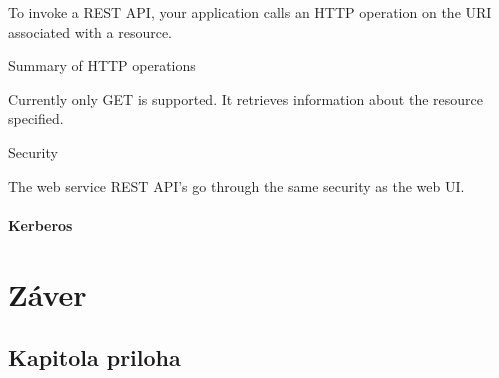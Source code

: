 \documentclass[11pt,final,oneside]{fithesis}
\begin{document}
To invoke a REST API, your application calls an HTTP operation on the URI associated with a resource.

Summary of HTTP operations

Currently only GET is supported. It retrieves information about the resource specified.

Security

The web service REST API’s go through the same security as the web UI. 
\cite{18}

\subsubsection{Kerberos}




\chapter{Záver}


\nocite{*}



\begin{appendix}
\chapter{Kapitola priloha}
\end{appendix}
\end{document}
